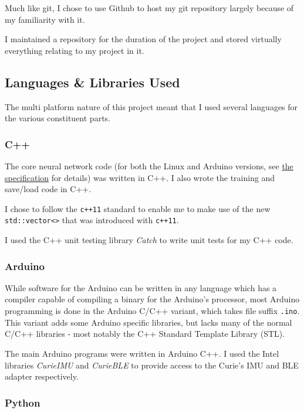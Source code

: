 \documentclass[a4paper]{article}
\begin{document}
Much like git, I chose to use Github\cite{ppref2} to host my git repository largely because of my familiarity with it. 

I maintained a repository\cite{ppref3} for the duration of the project and stored virtually everything relating to my project in it.

\subsection{Languages \& Libraries Used}%
\label{subsec:pp_ll}

The multi platform nature of this project meant that I used several languages for the various constituent parts.

\subsubsection{C++}

The core neural network code (for both the Linux and Arduino versions, see \hyperref[sec:dn]{the specification} for details) was written in C++\cite{ppref4}. I also wrote the training and save/load code in C++.

I chose to follow the \lstinline{c++11}\cite{ppref5} standard to enable me to make use of the new \lstinline{std::vector<>} that was introduced with \lstinline{c++11}.

I used the C++ unit testing library \textit{Catch}\cite{ppref6} to write unit tests for my C++ code.

\subsubsection{Arduino}

While software for the Arduino can be written in any language which has a compiler capable of compiling a binary for the Arduino's processor, most Arduino programming is done in the Arduino C/C++ variant\cite{ppref7}, which takes file suffix \lstinline{.ino}. This variant adds some Arduino specific libraries\cite{ppref8}, but lacks many of the normal C/C++ libraries - most notably the C++ Standard Template Library (STL).\cite{ppref9}

The main Arduino programs were written in Arduino C++. I used the Intel libraries \textit{CurieIMU}\cite{ppref10} and \textit{CurieBLE}\cite{ppref11} to provide access to the Curie's IMU and BLE adapter respectively.

\subsubsection{Python}
\end{document}

